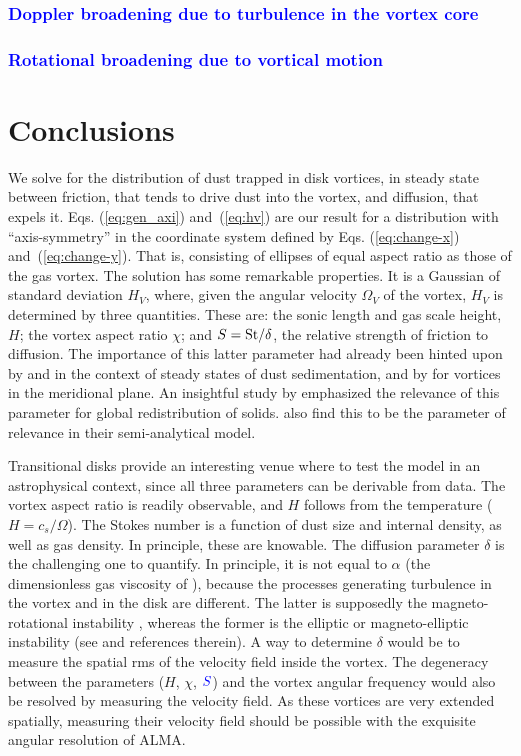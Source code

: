 \documentclass[apj]{emulateapj}
\def\blue#1{\textcolor{blue}{#1}}
\newcommand{\Eqs}[2]{Eqs. (\ref{#1}) and~(\ref{#2})}
\newcommand{\eqs}[2]{\Eqs{#1}{#2}}
\newcommand{\St}{{\rm St}}
\begin{document}
\subsubsection{\blue{Doppler broadening due to turbulence in the vortex core}}

\subsubsection{\blue{Rotational broadening due to vortical motion}}

\section{Conclusions}

We solve for the distribution of dust trapped in
disk vortices, in steady state between friction, that 
tends to drive dust into the vortex, and diffusion, that expels
it. \eqs{eq:gen_axi}{eq:hv} are our result for a distribution with
``axis-symmetry''  in the coordinate system defined by
\eqs{eq:change-x}{eq:change-y}. That is, consisting of ellipses of
equal aspect ratio as those of the gas vortex. The solution has some remarkable
properties. It is a Gaussian of standard deviation $H_V$, where, given
the angular velocity $\varOmega_V$ of the vortex, $H_V$
is determined by three quantities. These are: 
the sonic length and gas scale height, $H$; the vortex aspect ratio
$\chi$; and \blue{$S=\St/\delta$}, the relative strength of friction to
diffusion. The importance of this latter parameter had already been 
hinted upon by \citet{Cuzzi93} and \citet{Dubrulle95} 
in the context of steady states of dust sedimentation, and by
\citet{Klahr-Henning97} for vortices in the meridional plane. An insightful study by 
\citet{Jacquet12} emphasized the relevance of this parameter for 
global redistribution of solids. \citet{Birnstiel13} also find this to be 
the parameter of relevance in their semi-analytical model.

Transitional disks provide an interesting venue where to test the
model in an astrophysical context, since all three parameters can be
derivable from data. The vortex aspect ratio is readily observable,
and $H$ follows from the temperature ($H=c_s/\varOmega$). The Stokes number is a function of
dust size and internal density, as well as gas density. In principle,
these are knowable. The diffusion parameter $\delta$ is the
challenging one to quantify. In principle, it is not equal to
$\alpha$ (the dimensionless gas viscosity of
\citealt{Shakura-Sunyaev73}), because the processes generating turbulence in the
vortex and in the disk are different. The latter is supposedly the
magneto-rotational instability \citep[MRI,][]{Balbus-Hawley91}, whereas the former is the elliptic or
magneto-elliptic instability (see \citealt{Lyra13} and references
therein). A way to determine $\delta$ would be to measure the spatial rms of
the velocity field inside the vortex. The degeneracy between the
parameters ($H$, $\chi$, $\blue{S}$) and the vortex angular frequency
would also be resolved by measuring the velocity field. As these
vortices are very extended spatially, measuring their velocity field
should be possible with the exquisite angular resolution of ALMA.
\end{document}
